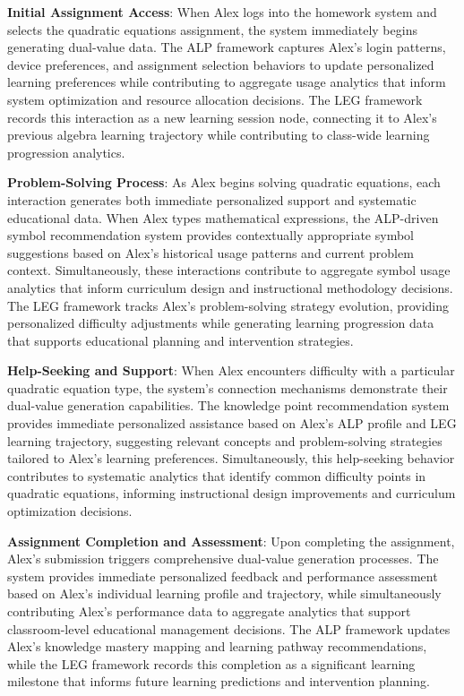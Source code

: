 \documentclass[conference]{IEEEtran}
\begin{document}
\begin{IEEEkeywords}
\textbf{Initial Assignment Access}: When Alex logs into the homework system and selects the quadratic equations assignment, the system immediately begins generating dual-value data. The ALP framework captures Alex's login patterns, device preferences, and assignment selection behaviors to update personalized learning preferences while contributing to aggregate usage analytics that inform system optimization and resource allocation decisions. The LEG framework records this interaction as a new learning session node, connecting it to Alex's previous algebra learning trajectory while contributing to class-wide learning progression analytics.

\textbf{Problem-Solving Process}: As Alex begins solving quadratic equations, each interaction generates both immediate personalized support and systematic educational data. When Alex types mathematical expressions, the ALP-driven symbol recommendation system provides contextually appropriate symbol suggestions based on Alex's historical usage patterns and current problem context. Simultaneously, these interactions contribute to aggregate symbol usage analytics that inform curriculum design and instructional methodology decisions. The LEG framework tracks Alex's problem-solving strategy evolution, providing personalized difficulty adjustments while generating learning progression data that supports educational planning and intervention strategies.

\textbf{Help-Seeking and Support}: When Alex encounters difficulty with a particular quadratic equation type, the system's connection mechanisms demonstrate their dual-value generation capabilities. The knowledge point recommendation system provides immediate personalized assistance based on Alex's ALP profile and LEG learning trajectory, suggesting relevant concepts and problem-solving strategies tailored to Alex's learning preferences. Simultaneously, this help-seeking behavior contributes to systematic analytics that identify common difficulty points in quadratic equations, informing instructional design improvements and curriculum optimization decisions.

\textbf{Assignment Completion and Assessment}: Upon completing the assignment, Alex's submission triggers comprehensive dual-value generation processes. The system provides immediate personalized feedback and performance assessment based on Alex's individual learning profile and trajectory, while simultaneously contributing Alex's performance data to aggregate analytics that support classroom-level educational management decisions. The ALP framework updates Alex's knowledge mastery mapping and learning pathway recommendations, while the LEG framework records this completion as a significant learning milestone that informs future learning predictions and intervention planning.


\end{IEEEkeywords}
\end{document}
